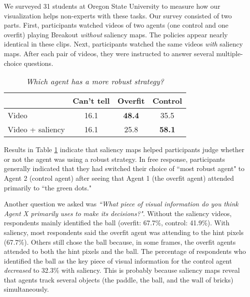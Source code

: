 \documentclass{article}
\begin{document}
We surveyed 31 students at Oregon State University to measure how our visualization helps non-experts with these tasks. Our survey consisted of two parts. First, participants watched videos of two agents (one control and one overfit) playing Breakout \textit{without} saliency maps. The policies appear nearly identical in these clips. Next, participants watched the same videos \textit{with} saliency maps. After each pair of videos, they were instructed to answer several multiple-choice questions.
\begin{table}[h!]
\centering
\caption{\textit{Which agent has a more robust strategy?}}
\label{tab:robustness}
\begin{tabular}{@{}lccc@{}}
\toprule
                    & Can't tell & Overfit           & Control           \\ \midrule
Video               & 16.1       & \textbf{48.4}     & 35.5              \\
Video + saliency    & 16.1       & 25.8              & \textbf{58.1}     \\ \bottomrule
\end{tabular}
\end{table}

Results in Table \ref{tab:robustness} indicate that saliency maps helped participants judge whether or not the agent was using a robust strategy. In free response, participants generally indicated that they had switched their choice of ``most robust agent" to Agent 2 (control agent) after seeing that Agent 1 (the overfit agent) attended primarily to ``the green dots." 

Another question we asked was \textit{``What piece of visual information do you think Agent X primarily uses to make its decisions?"}. Without the saliency videos, respondents mainly identified the ball (overfit: 67.7\%, control: 41.9\%). With saliency, most respondents said the overfit agent was attending to the hint pixels (67.7\%). Others still chose the ball because, in some frames, the overfit agents attended to both the hint pixels and the ball. The percentage of respondents who identified the ball as the key piece of visual information for the control agent \textit{decreased} to 32.3\% with saliency. This is probably because saliency maps reveal that agents track several objects (the paddle, the ball, and the wall of bricks) simultaneously.
\end{document}
